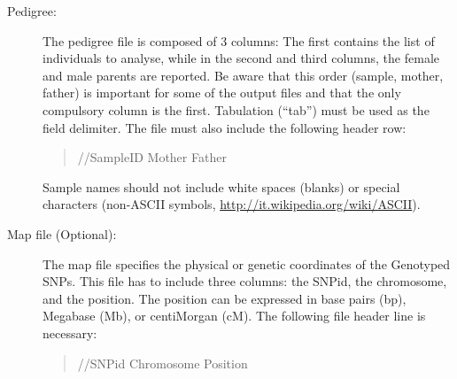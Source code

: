 \documentclass[a4paper,11pt,english]{article}
\begin{document}
\begin{description}
\item [Pedigree:]
The pedigree file is composed of 3 columns: The first contains the list of individuals to analyse,
while in the second and third columns, the female and male parents are reported.
Be aware that this order (sample, mother, father) is important for some of the output files and
that the only compulsory column is the first. 
Tabulation (``tab'') must be used as the field
delimiter. The file must also include the following header row:
\begin{quote}

//SampleID Mother Father
\end{quote}

Sample names should not include white spaces (blanks) or special characters (non-ASCII symbols,
\href{http://it.wikipedia.org/wiki/ASCII}{http://it.wikipedia.org/wiki/ASCII}).

\item[Map file (Optional):]
The map file specifies the physical or genetic  coordinates of the Genotyped SNPs. This file has to include three columns:
the SNPid, the chromosome, and the position. The position can be expressed in base pairs (bp),
Megabase (Mb), or centiMorgan (cM).
The following file header line is necessary:
\begin{quote}

//SNPid Chromosome Position
\end{quote}
\end{description}
\end{document}
